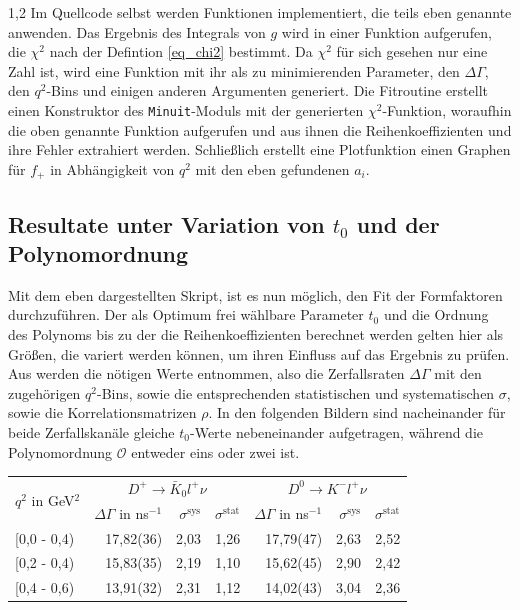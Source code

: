 \documentclass[11pt,a4paper,twoside]{report}
\begin{document}
\begin{spacing}{1,2}
\noindent
Im Quellcode selbst werden Funktionen implementiert, die teils eben genannte anwenden. Das Ergebnis des Integrals von $g$ wird in einer Funktion aufgerufen,
die $\chi^2$ nach der Defintion \eqref{eq_chi2} bestimmt. Da $\chi^2$ für sich gesehen nur eine Zahl ist, wird eine Funktion mit ihr als zu minimierenden
Parameter, den $\Delta \Gamma$, den $q^2$-Bins und einigen anderen Argumenten generiert. Die Fitroutine erstellt einen Konstruktor des \texttt{Minuit}-Moduls mit 
der generierten $\chi^2$-Funktion, woraufhin die oben genannte Funktion aufgerufen und aus ihnen die Reihenkoeffizienten und ihre Fehler 
extrahiert werden. Schließlich erstellt eine Plotfunktion einen Graphen für $f_+$ in Abhängigkeit von $q^2$ mit den eben gefundenen $a_i$. 

\subsection{Resultate unter Variation von $t_0$ und der Polynomordnung}
Mit dem eben dargestellten Skript, ist es nun möglich, den Fit der Formfaktoren durchzuführen. Der als Optimum frei wählbare Parameter $t_0$ und die 
Ordnung des Polynoms bis zu der die Reihenkoeffizienten berechnet werden gelten hier als Größen, die variert werden können, um ihren Einfluss auf das
Ergebnis zu prüfen. Aus \cite{PhysRev_Data} werden die nötigen Werte entnommen, also die Zerfallsraten $\Delta \Gamma$ mit den zugehörigen $q^2$-Bins,
sowie die entsprechenden statistischen und systematischen $\sigma$, sowie die Korrelationsmatrizen $\rho$. In den folgenden Bildern sind 
nacheinander für beide Zerfallskanäle gleiche $t_0$-Werte nebeneinander aufgetragen, während die Polynomordnung $\mathcal{O}$ entweder eins oder zwei ist.
 \renewcommand{\arraystretch}{1.2}
 \begin{table}[h]
   \begin{tabular}{l|rrr|rrr}
   \toprule
     \multirow{2}{*}{$q^2$ in GeV$^2$}& \multicolumn{3}{c|}{$D^+ \rightarrow \bar K_0 l^+ \nu$} & \multicolumn{3}{c}{$D^0 \rightarrow  K^- l^+ \nu$}\\
     \cline{2-7}
     & $\Delta \Gamma$ in ns$^{-1}$ & $\sigma^\text{sys}$ & $\sigma^\text{stat}$ & $\Delta \Gamma$ in ns$^{-1}$ & $\sigma^\text{sys}$ & $\sigma^\text{stat}$\\
    \midrule
   {[}0,0 - 0,4) & 	17,82(36)&	2,03&	1,26&	17,79(47)&	2,63&	2,52 \\
   {[}0,2 - 0,4)& 	15,83(35)&	2,19&	1,10&	15,62(45)&	2,90&	2,42\\
   {[}0,4 - 0,6) &	13,91(32)&	2,31&	1,12&	14,02(43)&	3,04&	2,36\\

\end{tabular}
\end{table}
\end{spacing}
\end{document}
